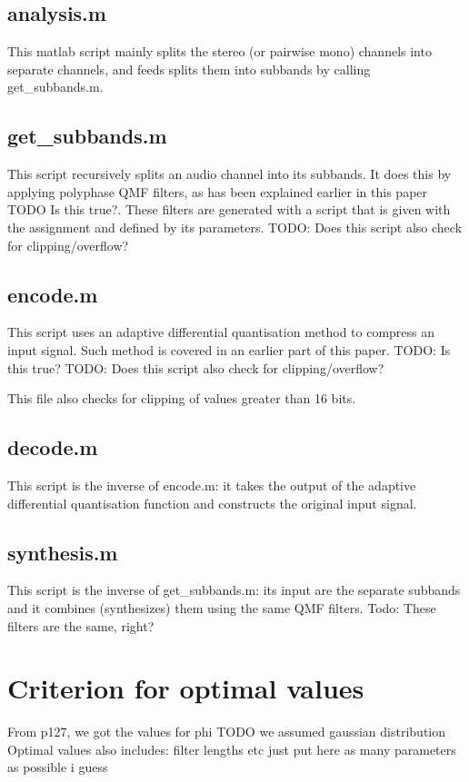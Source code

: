 \documentclass[a4paper]{article}
\begin{document}
\subsection{analysis.m}
This matlab script mainly splits the stereo (or pairwise mono) channels into separate channels, and feeds splits them into subbands by calling get\_subbands.m.

\subsection{get\_subbands.m}
This script recursively splits an audio channel into its subbands. It does this by applying polyphase QMF filters, as has been explained earlier in this paper TODO Is this true?. These filters are generated with a script that is given with the assignment and defined by its parameters.
TODO: Does this script also check for clipping/overflow?
\subsection{encode.m}
This script uses an adaptive differential quantisation method to compress an input signal. Such method is covered in an earlier part of this paper. TODO: Is this true?
TODO: Does this script also check for clipping/overflow?

This file also checks for clipping of values greater than 16 bits.

\subsection{decode.m}
This script is the inverse of encode.m: it takes the output of the adaptive differential quantisation function and constructs the original input signal.

\subsection{synthesis.m}
This script is the inverse of get\_subbands.m: its input are the separate subbands and it combines (synthesizes) them using the same QMF filters. Todo: These filters are the same, right?

\section{Criterion for optimal values}
From p127, we got the values for phi TODO we assumed gaussian distribution
Optimal values also includes: filter lengths etc just put here as many parameters as possible i guess
\end{document}
